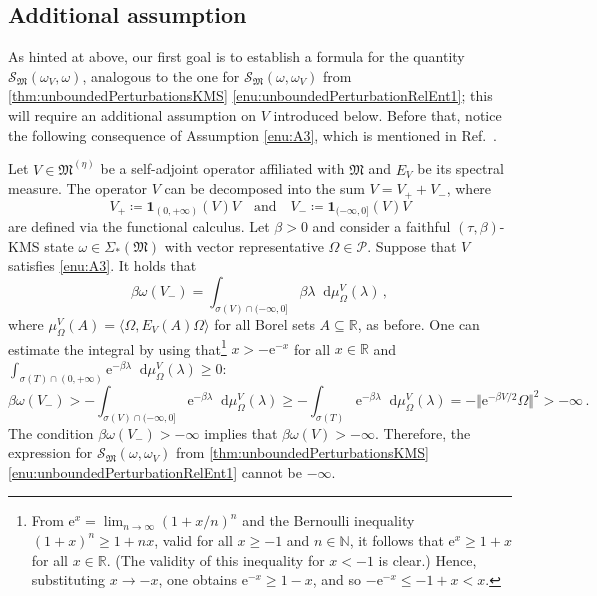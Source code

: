 \documentclass[a4paper, twoside, 11pt, reqno]{amsart}
\theoremstyle{definition}
\theoremstyle{plain}
\renewcommand{\subset}{\subseteq}
\renewcommand{\Sigma}{\varSigma}
\renewcommand{\Omega}{\varOmega}
\newcommand{\N}{\mathbb{N}}
\newcommand{\R}{\mathbb{R}}
\newcommand{\MS}{\mathcal{S}}
\newcommand{\MFM}{\mathfrak{M}}
\newcommand{\ee}{\mathrm{e}}
\newcommand{\NS}[1]{\Sigma_{\ast}(#1)}
\newcommand{\NPC}{\mathcal{P}}
\renewcommand{\AE}[1]{#1^{(\eta)}}
\newcommand{\1}{\mathbf{1}}
\newcommand{\diff}{\mathop{}\!\mathrm{d}}
\newcommand{\norm}[2][]{#1\Vert{#2}#1\Vert}
\newcommand{\braket}[2][]{#1\langle{#2}#1\rangle}
\newcommand{\ce}{\coloneqq}
\newcommand{\tand}{\quad\text{and}\quad}
\begin{document}
\subsection{Additional assumption}\label{subsec:extensionPerturbation}

As hinted at above, our first goal is to establish a formula for the quantity $\MS_\MFM (\omega_V, \omega)$, analogous to the one for $\MS_\MFM (\omega, \omega_V)$ from \cref{thm:unboundedPerturbationsKMS} \ref{enu:unboundedPerturbationRelEnt1}; this will require an additional assumption on $V$ introduced below. Before that, notice the following consequence of Assumption \ref{enu:A3}, which is mentioned in Ref.~\cite[p. 479]{DJP03}.

Let $V \in \AE{\MFM}$ be a self-adjoint operator affiliated with $\MFM$ and $E_V$ be its spectral measure. The operator $V$ can be decomposed into the sum $V = V_+ + V_-$, where
\begin{equation*}
    V_+ \ce \1_{(0, + \infty)}(V) V \tand V_- \ce \1_{(- \infty, 0]}(V) V
\end{equation*}
are defined via the functional calculus. Let $\beta > 0$ and consider a faithful $(\tau, \beta)$-KMS state $\omega \in \NS{\MFM}$ with vector representative $\Omega \in \NPC$. Suppose that $V$ satisfies \ref{enu:A3}. It holds that
\begin{equation*}
    \beta \omega(V_-) = \int_{\sigma(V) \cap (- \infty, 0]} \beta \lambda \diff \mu_\Omega^V(\lambda) \, ,
\end{equation*}
where $\mu_\Omega^V (A) = \braket{\Omega, E_V (A) \Omega}$ for all Borel sets $A \subset \R$, as before. One can estimate the integral by using that\footnote{From $\ee^x = \lim_{n \to \infty} (1 + x / n)^n$ and the Bernoulli inequality $(1 + x)^n \ge 1 + nx$, valid for all $x \ge -1$ and $n \in \N$, it follows that $\ee^{x} \ge 1 + x$ for all $x \in \R$. (The validity of this inequality for $x < - 1$ is clear.) Hence, substituting $x \to - x$, one obtains $\ee^{-x} \ge 1 - x$, and so $- \ee^{-x} \le - 1 + x < x$.\label{ftn:perturabtionTheory_exponentialInequality}} $x > - \ee^{- x}$ for all $x \in \R$ and $\int_{\sigma(T) \cap (0, + \infty)} \ee^{- \beta \lambda} \diff \mu_\Omega^V(\lambda) \ge 0$:
\begin{equation*}
    \beta \omega(V_-) > - \int_{\sigma(V) \cap (- \infty, 0]} \ee^{- \beta \lambda} \diff \mu_\Omega^V(\lambda) \ge - \int_{\sigma(T)} \ee^{- \beta \lambda} \diff \mu_\Omega^V(\lambda) = - \norm{\ee^{- \beta V / 2} \Omega}^2 > - \infty \, .
\end{equation*}
The condition $\beta \omega(V_-) > - \infty$ implies that $\beta \omega(V) > - \infty$. Therefore, the expression for $\MS_\MFM (\omega, \omega_V)$ from \cref{thm:unboundedPerturbationsKMS} \ref{enu:unboundedPerturbationRelEnt1} cannot be $- \infty$.
\end{document}
